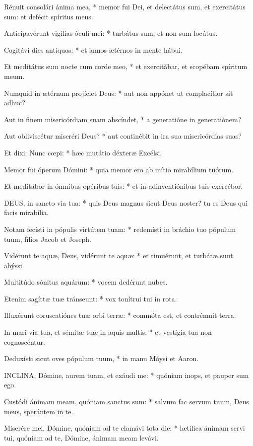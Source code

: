 Rénuit consolári ánima mea, * memor fui Dei, et delectátus sum, et exercitátus sum: et defécit spíritus meus.

Anticipavérunt vigílias óculi mei: * turbátus sum, et non sum locútus.

Cogitávi dies antíquos: * et annos ætérnos in mente hábui.

Et meditátus sum nocte cum corde meo, * et exercitábar, et scopébam spíritum meum.

Numquid in ætérnum projíciet Deus: * aut non appónet ut complacítior sit adhuc?

Aut in finem misericórdiam suam abscíndet, * a generatióne in generatiónem?

Aut obliviscétur miseréri Deus? * aut continébit in ira sua misericórdias suas?

Et dixi: Nunc cœpi: * hæc mutátio déxteræ Excélsi.

Memor fui óperum Dómini: * quia memor ero ab inítio mirabílium tuórum.

Et meditábor in ómnibus opéribus tuis: * et in adinventiónibus tuis exercébor.


\lettrine[lines=2]{D}{EUS}, in sancto via tua: * quis Deus magnus sicut Deus noster? tu es Deus qui facis mirabília.

Notam fecísti in pópulis virtútem tuam: * redemísti in bráchio tuo pópulum tuum, fílios Jacob et Joseph.

Vidérunt te aquæ, Deus, vidérunt te aquæ: * et timuérunt, et turbátæ sunt abýssi.

Multitúdo sónitus aquárum: * vocem dedérunt nubes.

Etenim sagíttæ tuæ tránseunt: * vox tonítrui tui in rota.

Illuxérunt coruscatiónes tuæ orbi terræ: * commóta est, et contrémuit terra.

In mari via tua, et sémitæ tuæ in aquis multis: * et vestígia tua non cognoscéntur.

Deduxísti sicut oves pópulum tuum, * in manu Móysi et Aaron.


\lettrine[lines=2]{I}{NCLINA}, Dómine, aurem tuam, et exáudi me: * quóniam inops, et pauper sum ego.

Custódi ánimam meam, quóniam sanctus sum: * salvum fac servum tuum, Deus meus, sperántem in te.

Miserére mei, Dómine, quóniam ad te clamávi tota die: * lætífica ánimam servi tui, quóniam ad te, Dómine, ánimam meam levávi.

